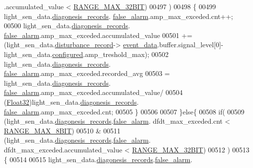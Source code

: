 \begin{DoxyCode}
      .accumulated\_value < \hyperlink{a00021_a334bd006b6d2b397dbfc620d62c3c35c}{RANGE\_MAX\_32BIT})
00497                )
00498                \{
00499                      light\_sen\_data.\hyperlink{a00024_a7ae905b560513ad201e58c2f63375030}{diagonesis\_records}.
      \hyperlink{a00017_a799f50625c0c03f9404a59287810113d}{false\_alarm}.amp\_max\_exceded.cnt++;
00500                      light\_sen\_data.\hyperlink{a00024_a7ae905b560513ad201e58c2f63375030}{diagonesis\_records}.
      \hyperlink{a00017_a799f50625c0c03f9404a59287810113d}{false\_alarm}.amp\_max\_exceded.accumulated\_value
00501                      +=(light\_sen\_data.\hyperlink{a00024_ac9b38e2c1d3f1013a88d33506c754152}{disturbance\_record}->
      \hyperlink{a00028_a8c0bda69e71ef674e60da47ad0be9ab0}{event\_data}.buffer.signal\_level[0]-light\_sen\_data.\hyperlink{a00024_a94b2d1f6ea4ab334c74d24984dd27843}{configured}.amp\_treshold\_max);
00502                      light\_sen\_data.\hyperlink{a00024_a7ae905b560513ad201e58c2f63375030}{diagonesis\_records}.
      \hyperlink{a00017_a799f50625c0c03f9404a59287810113d}{false\_alarm}.amp\_max\_exceded.recorded\_avg
00503                      = light\_sen\_data.\hyperlink{a00024_a7ae905b560513ad201e58c2f63375030}{diagonesis\_records}.
      \hyperlink{a00017_a799f50625c0c03f9404a59287810113d}{false\_alarm}.amp\_max\_exceded.accumulated\_value/
00504                              (\hyperlink{a00072_a87d38f886e617ced2698fc55afa07637}{Float32})light\_sen\_data.\hyperlink{a00024_a7ae905b560513ad201e58c2f63375030}{diagonesis\_records}.
      \hyperlink{a00017_a799f50625c0c03f9404a59287810113d}{false\_alarm}.amp\_max\_exceded.cnt;
00505               \}
00506 
00507              \}\textcolor{keywordflow}{else}\{
00508              \textcolor{keywordflow}{if}(
00509                 (light\_sen\_data.\hyperlink{a00024_a7ae905b560513ad201e58c2f63375030}{diagonesis\_records}.\hyperlink{a00017_a799f50625c0c03f9404a59287810113d}{false\_alarm}.
      dfdt\_max\_exceded.cnt < \hyperlink{a00021_ae0c75a1cb44e5d3f00ec7c9e40acfda8}{RANGE\_MAX\_8BIT})
00510                 &
00511                 (light\_sen\_data.\hyperlink{a00024_a7ae905b560513ad201e58c2f63375030}{diagonesis\_records}.\hyperlink{a00017_a799f50625c0c03f9404a59287810113d}{false\_alarm}.
      dfdt\_max\_exceded.accumulated\_value < \hyperlink{a00021_a334bd006b6d2b397dbfc620d62c3c35c}{RANGE\_MAX\_32BIT})
00512                )
00513              \{
00514 
00515                  light\_sen\_data.\hyperlink{a00024_a7ae905b560513ad201e58c2f63375030}{diagonesis\_records}.\hyperlink{a00017_a799f50625c0c03f9404a59287810113d}{false\_alarm}.

\end{DoxyCode}
